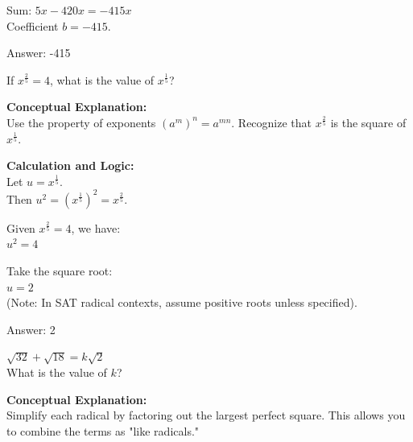 \documentclass[11pt,paper=a4,answers]{exam}
\begin{document}
\begin{questions}
\begin{solution}
\vspace{10pt}

Sum: $5x - 420x = -415x$ \\
Coefficient $b = -415$.

\vspace{25pt}

Answer: \colorbox{yellow!100}{-415}
\end{solution}


\question
If $x^{\frac{2}{5}} = 4$, what is the value of $x^{\frac{1}{5}}$?

\begin{solution}
\textbf{Conceptual Explanation:} \\
Use the property of exponents $(a^m)^n = a^{mn}$. Recognize that $x^{\frac{2}{5}}$ is the square of $x^{\frac{1}{5}}$.

\vspace{20pt}

\textbf{Calculation and Logic:} \\
Let $u = x^{\frac{1}{5}}$. \\
Then $u^2 = (x^{\frac{1}{5}})^2 = x^{\frac{2}{5}}$.

\vspace{10pt}

Given $x^{\frac{2}{5}} = 4$, we have: \\
$u^2 = 4$

\vspace{10pt}

Take the square root: \\
$u = 2$ \\
(Note: In SAT radical contexts, assume positive roots unless specified).

\vspace{25pt}

Answer: \colorbox{yellow!100}{2}
\end{solution}

\vspace{40pt}

\question
$\sqrt{32} + \sqrt{18} = k\sqrt{2}$ \\
What is the value of $k$?

\begin{solution}
\textbf{Conceptual Explanation:} \\
Simplify each radical by factoring out the largest perfect square. This allows you to combine the terms as "like radicals."


\end{solution}
\end{questions}
\end{document}
